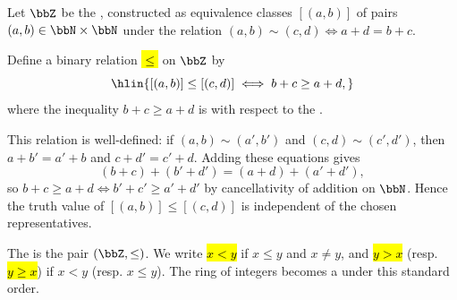\begin{definition} \label{definition:standard_order_on_ring_of_integers}
Let $\bbZ$ be the , constructed as equivalence classes $[(a,b)]$ of pairs $(a,b) \in \bbN \times \bbN$ under the relation $(a,b) \sim (c,d) \iff a + d = b + c$.

Define a binary relation \hl{$\le$} on $\bbZ$ by
$$\hlin{[(a,b)] \le [(c,d)] \iff b + c \geq a + d,}$$
where the inequality $b + c \geq a + d$ is with respect to the .

This relation is well-defined: if $(a,b) \sim (a',b')$ and $(c,d) \sim (c',d')$, then $a + b' = a' + b$ and $c + d' = c' + d$. Adding these equations gives
$$(b + c) + (b' + d') = (a + d) + (a' + d'),$$
so $b + c \geq a + d \iff b' + c' \geq a' + d'$ by cancellativity of addition on $\bbN$. Hence the truth value of $[(a,b)] \le [(c,d)]$ is independent of the chosen representatives.

The  is the pair $(\bbZ, \le)$. We write \hl{$x < y$} if $x \le y$ and $x \neq y$, and \hl{$y > x$} (resp. \hl{$y \ge x$}) if $x < y$ (resp. $x \le y$). The ring of integers becomes a  under this standard order.
\end{definition}
